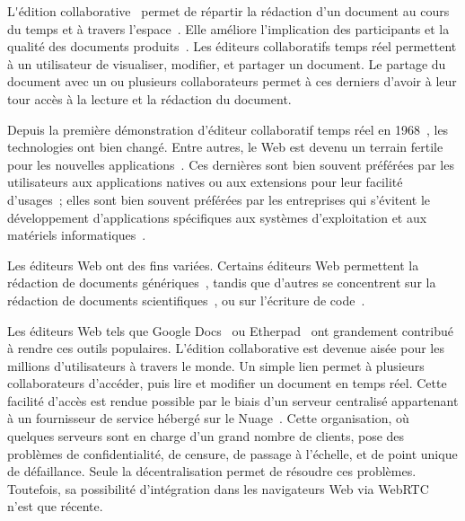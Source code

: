 
\lettrine{L}'édition collaborative~\cite{ellis1989concurrency,
  johansen1988groupware} permet de répartir la rédaction d'un document au cours
du temps et à travers l'espace~\cite{desanctis1987foundation,
  grudin1994computersupported, johansen1988groupware}. Elle améliore
l'implication des participants et la qualité des documents
produits~\cite{giles2005internet, noel2004empirical}. Les éditeurs collaboratifs
temps réel permettent à un utilisateur de visualiser, modifier, et partager un
document. Le partage du document avec un ou plusieurs collaborateurs permet à
ces derniers d'avoir à leur tour accès à la lecture et la rédaction du document.

Depuis la première démonstration d'éditeur collaboratif temps réel en
1968~\cite{engelbart1968research}, les technologies ont bien changé. Entre
autres, le Web est devenu un terrain fertile pour les nouvelles
applications~\cite{lautamaki2013development}. Ces dernières sont bien souvent
préférées par les utilisateurs aux applications natives ou aux extensions pour
leur facilité d'usages~\cite{mogan2010impact}; elles sont bien souvent préférées
par les entreprises qui s'évitent le développement d'applications spécifiques
aux systèmes d'exploitation et aux matériels
informatiques~\cite{mogan2010impact}.

Les éditeurs Web ont des fins variées.  Certains éditeurs Web permettent la
rédaction de documents génériques~\cite{etherpad, googledocs, googlewave,
  hivejs}, tandis que d'autres se concentrent sur la rédaction de documents
scientifiques~\cite{authorea, overleaf, sharelatex, fidus}, ou sur l'écriture de
code~\cite{lautamaki2012cored, hyperdev}.

Les éditeurs Web tels que Google Docs~\cite{googledocs} ou
Etherpad~\cite{etherpad} ont grandement contribué à rendre ces outils
populaires. L'édition collaborative est devenue aisée pour les millions
d'utilisateurs à travers le monde. Un simple lien permet à plusieurs
collaborateurs d'accéder, puis lire et modifier un document en temps réel.
Cette facilité d'accès est rendue possible par le biais d'un serveur centralisé
appartenant à un fournisseur de service hébergé sur le
Nuage~\cite{mell2011national}. Cette organisation, où quelques serveurs sont en
charge d'un grand nombre de clients, pose des problèmes de confidentialité, de
censure, de passage à l'échelle, et de point unique de défaillance. Seule la
décentralisation permet de résoudre ces problèmes. Toutefois, sa possibilité
d'intégration dans les navigateurs Web via WebRTC~\cite{webrtc} n'est que
récente.

